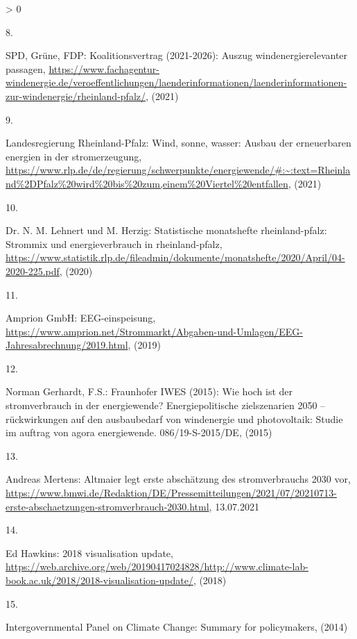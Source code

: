 \documentclass[a4paper,11pt]{article}
\newlength{\cslhangindent}
\newlength{\csllabelwidth}
\newenvironment{CSLReferences}[3] %
 {%
  \setlength{\parindent}{0pt}
  \ifodd #1 \everypar{\setlength{\hangindent}{\cslhangindent}}\ignorespaces\fi
  \ifnum #2 > 0
  \setlength{\parskip}{#2\baselineskip}
  \fi
 }%
 {}
\newcommand{\CSLLeftMargin}[1]{\parbox[t]{\maxof{\widthof{#1}}{\csllabelwidth}}{#1}}
\newcommand{\CSLRightInline}[1]{\parbox[t]{\linewidth}{#1}}
\begin{document}
\begin{CSLReferences}{0}{0}
\leavevmode\hypertarget{ref-SPDGruneFDP.2021}{}%
\CSLLeftMargin{8. }
\CSLRightInline{SPD, Grüne, FDP: Koalitionsvertrag (2021-2026): Auszug windenergierelevanter passagen, \url{https://www.fachagentur-windenergie.de/veroeffentlichungen/laenderinformationen/laenderinformationen-zur-windenergie/rheinland-pfalz/}, (2021)}

\leavevmode\hypertarget{ref-LandesregierungRheinlandPfalz.2021}{}%
\CSLLeftMargin{9. }
\CSLRightInline{Landesregierung Rheinland-Pfalz: Wind, sonne, wasser: Ausbau der erneuerbaren energien in der stromerzeugung, \url{https://www.rlp.de/de/regierung/schwerpunkte/energiewende/\#:~:text=Rheinland\%2DPfalz\%20wird\%20bis\%20zum,einem\%20Viertel\%20entfallen}, (2021)}

\leavevmode\hypertarget{ref-Lehnert.2020}{}%
\CSLLeftMargin{10. }
\CSLRightInline{Dr. N. M. Lehnert und M. Herzig: Statistische monatshefte rheinland-pfalz: Strommix und energieverbrauch in rheinland-pfalz, \url{https://www.statistik.rlp.de/fileadmin/dokumente/monatshefte/2020/April/04-2020-225.pdf}, (2020)}

\leavevmode\hypertarget{ref-AmprionGmbH.2019}{}%
\CSLLeftMargin{11. }
\CSLRightInline{Amprion GmbH: EEG-einspeisung, \url{https://www.amprion.net/Strommarkt/Abgaben-und-Umlagen/EEG-Jahresabrechnung/2019.html}, (2019)}

\leavevmode\hypertarget{ref-NormanGerhardt.2015}{}%
\CSLLeftMargin{12. }
\CSLRightInline{Norman Gerhardt, F.S.: Fraunhofer IWES (2015): Wie hoch ist der stromverbrauch in der energiewende? Energiepolitische zielszenarien 2050 -- r{ü}ckwirkungen auf den ausbaubedarf von windenergie und photovoltaik: Studie im auftrag von agora energiewende. 086/19-S-2015/DE, (2015)}

\leavevmode\hypertarget{ref-AndreasMertens.13.07.2021}{}%
\CSLLeftMargin{13. }
\CSLRightInline{Andreas Mertens: Altmaier legt erste absch{ä}tzung des stromverbrauchs 2030 vor, \url{https://www.bmwi.de/Redaktion/DE/Pressemitteilungen/2021/07/20210713-erste-abschaetzungen-stromverbrauch-2030.html}, 13.07.2021}

\leavevmode\hypertarget{ref-EdHawkins.2018}{}%
\CSLLeftMargin{14. }
\CSLRightInline{Ed Hawkins: 2018 visualisation update, \url{https://web.archive.org/web/20190417024828/http://www.climate-lab-book.ac.uk/2018/2018-visualisation-update/}, (2018)}

\leavevmode\hypertarget{ref-IntergovernmentalPanelonClimateChange.2014}{}%
\CSLLeftMargin{15. }
\CSLRightInline{Intergovernmental Panel on Climate Change: Summary for policymakers, (2014)}


\end{CSLReferences}
\end{document}
